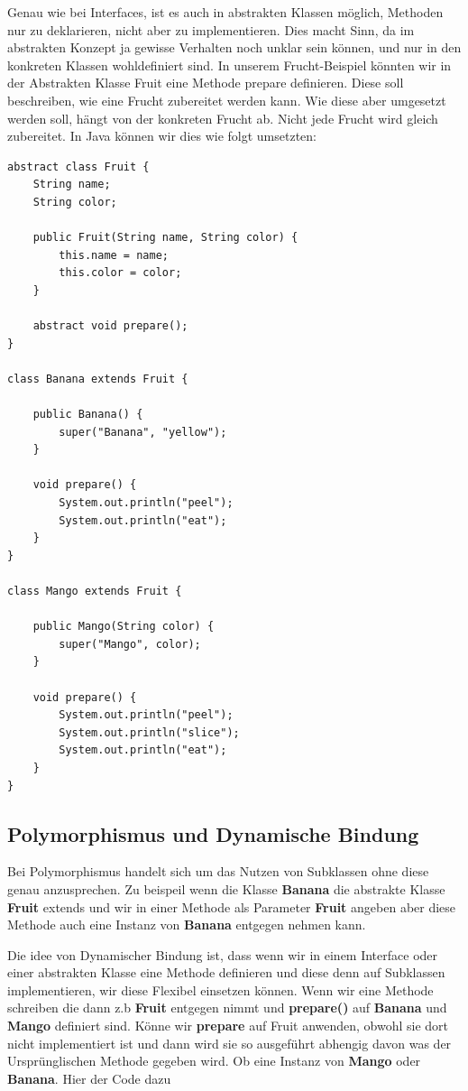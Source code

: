 \documentclass[12pt]{article}
\begin{document}
    Genau wie bei Interfaces, ist es auch in abstrakten Klassen möglich, Methoden nur zu deklarieren, nicht aber zu implementieren.
    Dies macht Sinn, da im abstrakten Konzept ja gewisse Verhalten noch unklar sein können, und nur in den konkreten Klassen wohldefiniert sind. 
    In unserem Frucht-Beispiel könnten wir in der Abstrakten Klasse Fruit eine Methode prepare definieren. 
    Diese soll beschreiben, wie eine Frucht zubereitet werden kann. 
    Wie diese aber umgesetzt werden soll, hängt von der konkreten Frucht ab. 
    Nicht jede Frucht wird gleich zubereitet. 
    In Java können wir dies wie folgt umsetzten:

    \begin{lstlisting}[caption=abstrakte Methoden]
abstract class Fruit {
    String name;
    String color;

    public Fruit(String name, String color) {
        this.name = name;
        this.color = color;
    }

    abstract void prepare();
}

class Banana extends Fruit {

    public Banana() {
        super("Banana", "yellow");
    }

    void prepare() {
        System.out.println("peel");
        System.out.println("eat");
    }
}

class Mango extends Fruit {

    public Mango(String color) {
        super("Mango", color);
    }

    void prepare() {
        System.out.println("peel");
        System.out.println("slice");        
        System.out.println("eat");
    }
}
    \end{lstlisting}

    \subsection*{Polymorphismus und Dynamische Bindung}
    
    Bei Polymorphismus handelt sich um das Nutzen von Subklassen ohne diese genau 
    anzusprechen. Zu beispeil wenn die Klasse \textbf{Banana} die abstrakte Klasse 
    \textbf{Fruit} extends und wir in einer Methode als Parameter \textbf{Fruit} angeben 
    aber diese Methode auch eine Instanz von \textbf{Banana} entgegen nehmen kann. 

    Die idee von Dynamischer Bindung ist, dass wenn wir in einem Interface oder einer 
    abstrakten Klasse eine Methode definieren und diese denn auf Subklassen implementieren, 
    wir diese Flexibel einsetzen können. Wenn wir eine Methode schreiben die dann z.b 
    \textbf{Fruit} entgegen nimmt und \textbf{prepare()} auf \textbf{Banana} und \textbf{Mango}
    definiert sind. Könne wir \textbf{prepare} auf Fruit anwenden, obwohl sie dort nicht
    implementiert ist und dann wird sie so ausgeführt abhengig davon was der Ursprünglischen 
    Methode gegeben wird. Ob eine Instanz von \textbf{Mango} oder \textbf{Banana}. Hier der 
    Code dazu 
\end{document}
